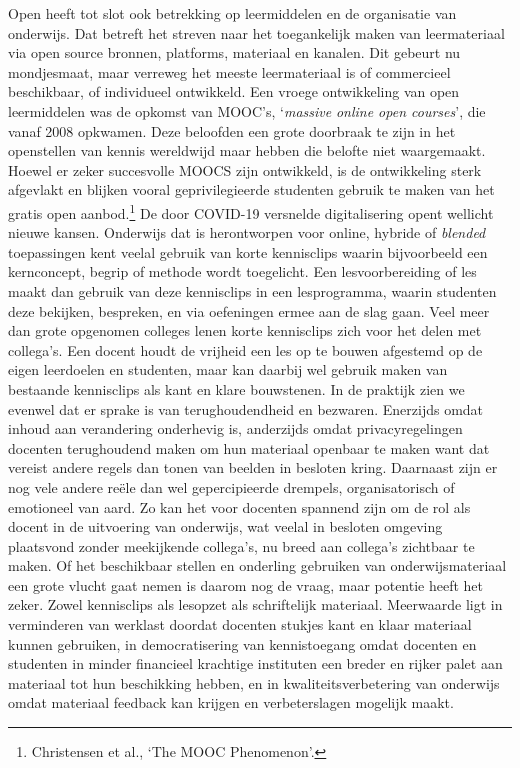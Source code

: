 \documentclass[smallauthor, chapterhaspagenum, nochapterinheader, pagenuminheader,  bigchapnum,medium2, tocpages, garamond, titleinheader]{jote-book}
\begin{document}
	Open heeft tot slot ook betrekking op leermiddelen en de organisatie van onderwijs. Dat betreft het streven naar het toegankelijk maken van leermateriaal via open source bronnen, platforms, materiaal en kanalen. Dit gebeurt nu mondjesmaat, maar verreweg het meeste leermateriaal is of commercieel beschikbaar, of individueel ontwikkeld. Een vroege ontwikkeling van open leermiddelen was de opkomst van MOOC's, ‘\emph{massive}\emph{ online open courses}', die vanaf 2008 opkwamen. Deze beloofden een grote doorbraak te zijn in het openstellen van kennis wereldwijd maar hebben die belofte niet waargemaakt. Hoewel er zeker succesvolle MOOCS zijn ontwikkeld, is de ontwikkeling sterk afgevlakt en blijken vooral geprivilegieerde studenten gebruik te maken van het gratis open aanbod.\footnote{Christensen et al., ‘The MOOC Phenomenon'.} De door COVID-19 versnelde digitalisering opent wellicht nieuwe kansen. Onderwijs dat is herontworpen voor online, hybride of \emph{blende}\emph{d} toepassingen kent veelal gebruik van korte kennisclips waarin bijvoorbeeld een kernconcept, begrip of methode wordt toegelicht. Een lesvoorbereiding of les maakt dan gebruik van deze kennisclips in een lesprogramma, waarin studenten deze bekijken, bespreken, en via oefeningen ermee aan de slag gaan. Veel meer dan grote opgenomen colleges lenen korte kennisclips zich voor het delen met collega's. Een docent houdt de vrijheid een les op te bouwen afgestemd op de eigen leerdoelen en studenten, maar kan daarbij wel gebruik maken van bestaande kennisclips als kant en klare bouwstenen. In de praktijk zien we evenwel dat er sprake is van terughoudendheid en bezwaren. Enerzijds omdat inhoud aan verandering onderhevig is, anderzijds omdat privacyregelingen docenten terughoudend maken om hun materiaal openbaar te maken want dat vereist andere regels dan tonen van beelden in besloten kring. Daarnaast zijn er nog vele andere reële dan wel gepercipieerde drempels, organisatorisch of emotioneel van aard. Zo kan het voor docenten spannend zijn om de rol als docent in de uitvoering van onderwijs, wat veelal in besloten omgeving plaatsvond zonder meekijkende collega's, nu breed aan collega's zichtbaar te maken. Of het beschikbaar stellen en onderling gebruiken van onderwijsmateriaal een grote vlucht gaat nemen is daarom nog de vraag, maar potentie heeft het zeker. Zowel kennisclips als lesopzet als schriftelijk materiaal. Meerwaarde ligt in verminderen van werklast doordat docenten stukjes kant en klaar materiaal kunnen gebruiken, in democratisering van kennistoegang omdat docenten en studenten in minder financieel krachtige instituten een breder en rijker palet aan materiaal tot hun beschikking hebben, en in kwaliteitsverbetering van onderwijs omdat materiaal feedback kan krijgen en verbeterslagen mogelijk maakt.
\end{document}
